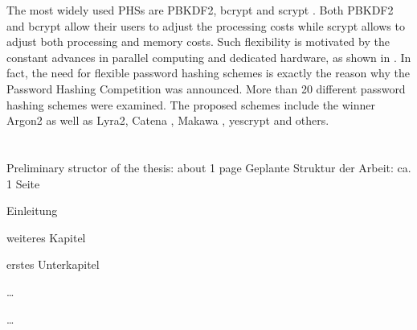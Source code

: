 \documentclass[a4paper,10pt,english]{INSOexpose}
\begin{document}
The most widely used PHSs are PBKDF2, bcrypt and scrypt \cite{cryptoeprint:2015:265}\cite{Andrade:2016:Lyra2}. Both PBKDF2 \cite{moriarty2017pkcs} and bcrypt \cite{provos1999future} allow their users to adjust the processing costs while scrypt \cite{percival:2009:scrypt} allows to adjust both processing and memory costs. Such flexibility is motivated by the constant advances in parallel computing and dedicated hardware, as shown in \cite{orman2013twelve}. In fact, the need for flexible password hashing schemes is exactly the reason why the Password Hashing Competition was announced. More than 20 different password hashing schemes were examined. The proposed schemes include the winner Argon2 \cite{biryukov2016argon2} as well as Lyra2, Catena \cite{forler2013catena}, Makawa \cite{pornin2015makwa}, yescrypt \cite{peslyak2015yescrypt} and others.



\section{}

\langchooser
{	
	Preliminary structor of the thesis: about 1 page
}
{
	Geplante Struktur der Arbeit: ca. 1 Seite	
}


\begin{samepage}
  \begin{contentstructure}
    \item Einleitung	
    \item weiteres Kapitel 
    \begin{contentstructure}
      \item erstes Unterkapitel
      \item \dots
    \end{contentstructure}
    \item \dots
  \end{contentstructure}
\end{samepage}


\printbibliography
\end{document}

